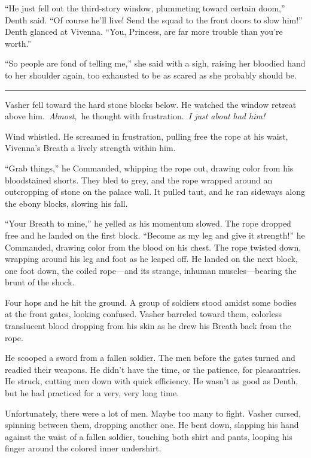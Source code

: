 “He just fell out the third-story window, plummeting toward certain doom,” Denth said. “Of course he’ll live! Send the squad to the front doors to slow him!” Denth glanced at Vivenna. “You, Princess, are far more trouble than you’re worth.”

“So people are fond of telling me,” she said with a sigh, raising her bloodied hand to her shoulder again, too exhausted to be as scared as she probably should be.

\bigskip \hrule \bigskip

Vasher fell toward the hard stone blocks below. He watched the window retreat above him.~\textit{Almost,}~he thought with frustration.~\textit{I just about had him!}

Wind whistled. He screamed in frustration, pulling free the rope at his waist, Vivenna’s Breath a lively strength within him.

“Grab things,” he Commanded, whipping the rope out, drawing color from his bloodstained shorts. They bled to grey, and the rope wrapped around an outcropping of stone on the palace wall. It pulled taut, and he ran sideways along the ebony blocks, slowing his fall.

“Your Breath to mine,” he yelled as his momentum slowed. The rope dropped free and he landed on the first block. “Become as my leg and give it strength!” he Commanded, drawing color from the blood on his chest. The rope twisted down, wrapping around his leg and foot as he leaped off. He landed on the next block, one foot down, the coiled rope—and its strange, inhuman muscles—bearing the brunt of the shock.

Four hops and he hit the ground. A group of soldiers stood amidst some bodies at the front gates, looking confused. Vasher barreled toward them, colorless translucent blood dropping from his skin as he drew his Breath back from the rope.

He scooped a sword from a fallen soldier. The men before the gates turned and readied their weapons. He didn’t have the time, or the patience, for pleasantries. He struck, cutting men down with quick efficiency. He wasn’t as good as Denth, but he had practiced for a very, very long time.

Unfortunately, there were a lot of men. Maybe too many to fight. Vasher cursed, spinning between them, dropping another one. He bent down, slapping his hand against the waist of a fallen soldier, touching both shirt and pants, looping his finger around the colored inner undershirt.

